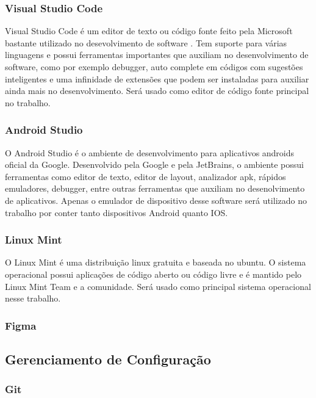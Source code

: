 \subsubsection{Visual Studio Code}

Visual Studio Code é um editor de texto ou código fonte feito pela Microsoft bastante utilizado no desevolvimento de software \cite{vscode2015}. Tem suporte para várias linguagens e possui ferramentas importantes que auxiliam no desenvolvimento de software, como por exemplo debugger, auto complete em códigos com sugestões inteligentes e uma infinidade de extensões que podem ser instaladas para auxiliar ainda mais no desenvolvimento. Será usado como editor de código fonte principal no trabalho. 

\subsubsection{Android Studio}

O Android Studio \cite{android2020} é o ambiente de desenvolvimento para aplicativos androids oficial da Google. Desenvolvido pela Google e pela JetBrains, o ambiente possui ferramentas como editor de texto, editor de layout, analizador apk, rápidos emuladores, debugger, entre outras ferramentas que auxiliam no desenolvimento de aplicativos. Apenas o emulador de dispositivo desse software será utilizado no trabalho por conter tanto dispositivos Android quanto IOS.

\subsubsection{Linux Mint}
O Linux Mint \cite{lm2020} é uma distribuição linux gratuita e baseada no ubuntu. O sistema operacional possui aplicações de código aberto ou código livre e é mantido pelo Linux Mint Team e a comunidade. Será usado como principal sistema operacional nesse trabalho.

\subsubsection{Figma}

\subsection{Gerenciamento de Configuração}

\subsubsection{Git}

